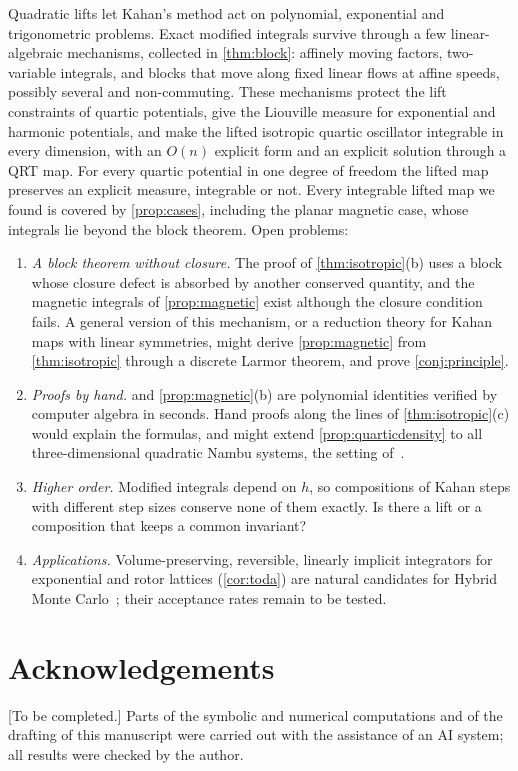 \documentclass[11pt,a4paper]{article}
\theoremstyle{definition}
\theoremstyle{remark}
\begin{document}
Quadratic lifts let Kahan's method act on polynomial, exponential and trigonometric problems. Exact modified
integrals survive through a few linear-algebraic mechanisms, collected in \cref{thm:block}: affinely moving
factors, two-variable integrals, and blocks that move along fixed linear flows at affine speeds, possibly
several and non-commuting. These mechanisms protect the lift constraints of quartic potentials, give the
Liouville measure for exponential and harmonic potentials, and make the lifted isotropic quartic oscillator
integrable in every dimension, with an $O(n)$ explicit form and an explicit solution through a QRT map. For
every quartic potential in one degree of freedom the lifted map preserves an explicit measure, integrable or
not. Every
integrable lifted map we found is covered by \cref{prop:cases}, including the planar magnetic case, whose
integrals lie beyond the block theorem. Open problems:
\begin{enumerate}[leftmargin=*]
\item \emph{A block theorem without closure.} The proof of \cref{thm:isotropic}(b) uses a block whose closure
  defect is absorbed by another conserved quantity, and the magnetic integrals of \cref{prop:magnetic} exist
  although the closure condition fails. A general version of this mechanism, or a reduction theory for Kahan
  maps with linear symmetries, might derive \cref{prop:magnetic} from \cref{thm:isotropic} through a discrete
  Larmor theorem, and prove \cref{conj:principle}.
\item \emph{Proofs by hand.}  and \cref{prop:magnetic}(b) are polynomial
  identities verified by computer algebra in seconds. Hand proofs along the lines of \cref{thm:isotropic}(c)
  would explain the formulas, and might extend \cref{prop:quarticdensity} to all three-dimensional quadratic
  Nambu systems, the setting of~\cite{LP}.
\item \emph{Higher order.} Modified integrals depend on $h$, so compositions of Kahan steps with different
  step sizes conserve none of them exactly. Is there a lift or a composition that keeps a common invariant?
\item \emph{Applications.} Volume-preserving, reversible, linearly implicit integrators for exponential and
  rotor lattices (\cref{cor:toda}) are natural candidates for Hybrid Monte Carlo~\cite{DKPR87}; their
  acceptance rates remain to be tested.
\end{enumerate}

\section*{Acknowledgements}
[To be completed.] Parts of the symbolic and numerical computations and of the drafting of this manuscript
were carried out with the assistance of an AI system; all results were checked by the author.
\end{document}
